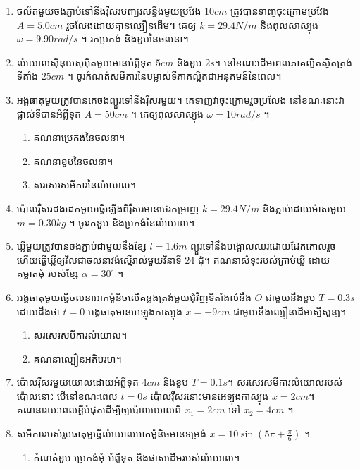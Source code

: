 \documentclass{officialexam}
\begin{document}
	\begin{enumerate}[m]
		\item ចល័តមួយចងភ្ជាប់ទៅនឹងរ៉ឺសរបញ្ឃរសន្ធឹងមួយប្រវែង $10cm$ ត្រូវបានទាញចុះក្រោមប្រវែង $A=5.0cm$ រួចលែងដោយគ្មានល្បឿនដើម។ គេឲ្យ $k=29.4N/m$ និងពុលសាស្យុង $\omega = 9.90rad/s$ ។ រកប្រកង់ និងខួបនៃចលនា។
		\item លំយោលសុីនុយសូអុីតមួយមានអំព្លីទុត $5cm$ និងខួប $2s$។ នៅខណៈដើមពេលភាគល្អិតស្ថិតត្រង់ទីតាំង $25cm$ ។ ចូរកំណត់សមីការនៃបម្លាស់ទីភាគល្អិតជាអនុគមន៍នៃពេល។
		\item អង្គធាតុមួយត្រូវបានគេចងព្យួរទៅនឹងរ៉ឺសរមួយ។ គេទាញវាចុះក្រោមរួចប្រលែង នៅខណៈនោះវាផ្លាស់ទីបានអំព្លីទុត $A=50cm$ ។ គេឲ្យពុលសាស្យុង $\omega=10rad/s$ ។
		\begin{enumerate}[k]
			\item គណនាប្រេកង់នៃចលនា។
			\item គណនាខួបនៃចលនា។
			\item សរសេរសមីការនៃលំយោល។
		\end{enumerate}
		\item ប៉ោលរ៉ឺសរដងដេកមួយធ្វើឡើងពីរ៉ឺសរមានថេរកម្រាញ $k=29.4N/m$ និងភ្ជាប់ដោយម៉ាសមួយ $m=0.30kg$ ។ ចូររកខួប និងប្រកង់នៃលំយោល។
		\item ឃ្លីមួយត្រូវបានចងភ្ជាប់ជាមួយនឹងខ្សែ $l=1.6m$ ព្យួរទៅនឹងបង្គោលឈរដោយដែកគោលរួចហើយធ្វើឃ្លីឲ្យវិលជាចលនាវង់ស្មើរាល់មួយវិនាទី $24$ ជុំ។ គណនាសំទុះរបស់គ្រាប់ឃ្លី ដោយគម្លាតមុំ របស់ខ្សែ $\alpha = 30^\circ$ ។
		\item អង្គធាតុមួយធ្វើចលនាអាកម៉ូនិចលើគន្លងត្រង់មួយជុំវិញទីតាំងលំនឹង $O$ ជាមួយនឹងខួប $T=0.3s$ ដោយដឹងថា $t=0$ អង្គធាតុមានអេឡុងកាស្យុង $x=-9cm$ ជាមួយនឹងល្បឿនដើមស្មើសូន្យ។
		\begin{enumerate}[k]
			\item សរសេរសមីការលំយោល។
			\item គណនាល្បឿនអតិបរមា។
		\end{enumerate}
		\item ប៉ោលរ៉ឺសរមួយយោលដោយអំព្លីទុត $4cm$ និងខួប $T=0.1s$។ សរសេរសមីការលំយោលរបស់ប៉ោលនោះ បើនៅខណៈពេល $t=0s$ ប៉ោលរ៉ឺសរនោះមានអេឡុង​​កា​​ស្យុង $x=2cm$។ គណនារយៈពេលខ្លីបំផុតដើម្បីឲ្យប៉ោលយោលពី $x_1=2cm$ ទៅ $x_2=4cm$ ។
		\item សមីការរបស់រួបធាតុមួធ្វើលំយោលអាកម៉ូនិចមានទម្រង់ $x=10\sin\left(5\pi + \frac{\pi}{6}\right)$ ។
		\begin{enumerate}[k]
			\item កំណត់ខួប ប្រេកង់មុំ អំព្លីទុត និងផាសដើមរបស់លំយោល។

\end{enumerate}
\end{enumerate}
\end{document}
